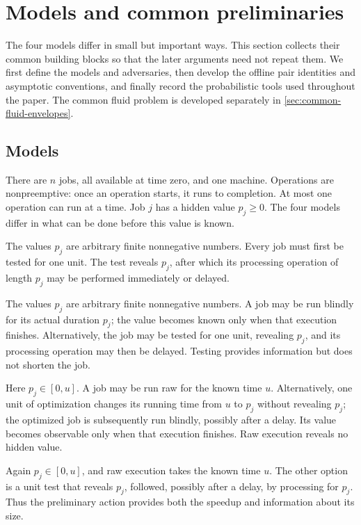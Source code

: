 \section{Models and common preliminaries}\label{sec:model}

The four models differ in small but important ways.  This section
collects their common building blocks so that the later arguments need not
repeat them.  We first define the models and adversaries, then develop the
offline pair identities and asymptotic conventions, and finally record the
probabilistic tools used throughout the paper.  The common fluid problem is
developed separately in \cref{sec:common-fluid-envelopes}.

\subsection{Models}

There are $n$ jobs, all available at time zero, and one machine.  Operations
are nonpreemptive: once an operation starts, it runs to completion.  At most
one operation can run at a time.  Job $j$ has
a hidden value $p_j\ge0$.  The four models differ in what can be done before
this value is known.

\begin{description}[leftmargin=*,style=nextline]
\item[Obligatory testing $\mathsf{OT}$.]
The values $p_j$ are arbitrary finite nonnegative numbers.  Every job must
first be tested for one unit.  The test reveals $p_j$, after which its
processing operation of length $p_j$ may be performed immediately or
delayed.

\item[Blind execution $\mathsf{BE}$.]
The values $p_j$ are arbitrary finite nonnegative numbers.  A job may be run
blindly for its actual duration $p_j$;
the value becomes known only when that execution finishes.  Alternatively,
the job may be tested for one unit, revealing $p_j$, and its processing
operation may then be delayed.  Testing provides information but does not
shorten the job.

\item[Blind optimization $\mathsf{BO}(u)$.]
Here $p_j\in[0,u]$.  A job may be run raw for the known time $u$.
Alternatively, one unit of optimization changes its running time from $u$
to $p_j$ without revealing $p_j$; the optimized job is subsequently run
blindly, possibly after a delay.  Its value becomes observable only when that
execution finishes.  Raw execution reveals no hidden value.

\item[Revealing optimization $\mathsf{RO}(u)$.]
Again $p_j\in[0,u]$, and raw execution takes the known time $u$.  The other
option is a unit test that reveals $p_j$, followed, possibly after a delay,
by processing for $p_j$.  Thus the preliminary action provides both the
speedup and information about its size.
\end{description}

